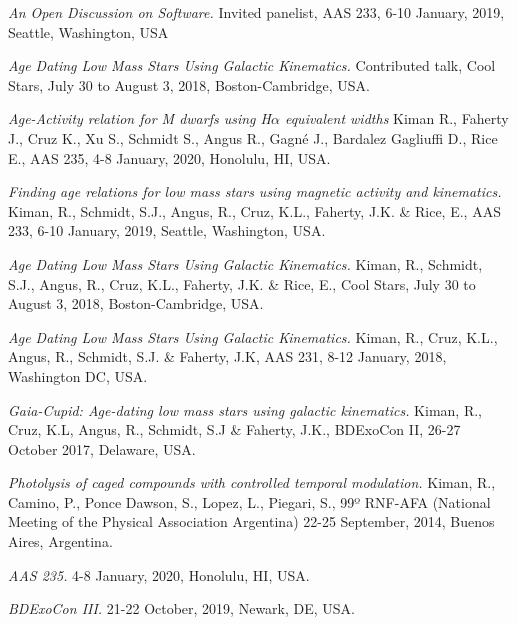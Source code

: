 \documentclass[10pt]{cv}
\begin{document}
\begin{llist}
\textit{An Open Discussion on Software.} Invited panelist, AAS 233, 6-10 January, 2019, Seattle, Washington, USA

\textit{Age Dating Low Mass Stars Using Galactic Kinematics.} Contributed talk, Cool Stars, July 30 to August 3, 2018, Boston-Cambridge, USA.




\textit{Age-Activity relation for M dwarfs using H$\alpha$ equivalent widths} Kiman R., Faherty J., Cruz K., Xu S., Schmidt S., Angus R., Gagn\'e J., Bardalez Gagliuffi D., Rice E., AAS 235, 4-8 January, 2020, Honolulu, HI, USA.

\textit{Finding age relations for low mass stars using magnetic activity and kinematics.} Kiman, R., Schmidt, S.J., Angus, R., Cruz, K.L., Faherty, J.K. \& Rice, E., AAS 233, 6-10 January, 2019, Seattle, Washington, USA.

\textit{Age Dating Low Mass Stars Using Galactic Kinematics.} Kiman, R., Schmidt, S.J., Angus, R., Cruz, K.L., Faherty, J.K. \& Rice, E., Cool Stars, July 30 to August 3, 2018, Boston-Cambridge, USA.

\textit{Age Dating Low Mass Stars Using Galactic Kinematics.} Kiman, R., Cruz, K.L., Angus, R., Schmidt, S.J. \& Faherty, J.K, AAS 231, 8-12 January, 2018, Washington DC, USA. 

\textit{Gaia-Cupid: Age-dating low mass stars using galactic kinematics.} Kiman, R., Cruz, K.L, Angus, R., Schmidt, S.J \& Faherty, J.K., BDExoCon II, 26-27 October 2017, Delaware, USA. 

\textit{Photolysis of caged compounds with controlled temporal modulation.} Kiman, R., Camino, P., Ponce Dawson, S., Lopez, L., Piegari, S., 99º RNF-AFA (National Meeting of the Physical Association Argentina) 22-25 September, 2014, Buenos Aires, Argentina.


\textit{AAS 235.} 4-8 January, 2020, Honolulu, HI, USA.

\textit{BDExoCon III.} 21-22 October, 2019, Newark, DE, USA.


\end{llist}
\end{document}
